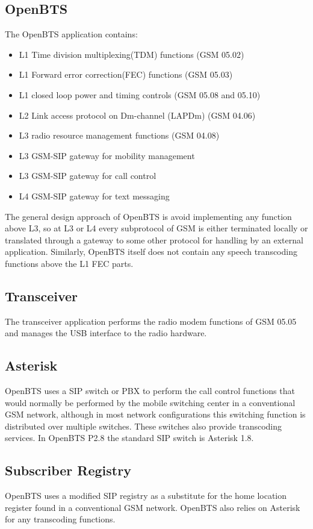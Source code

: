  \subsection{OpenBTS}
The OpenBTS application contains:
\begin{itemize}
	\item L1 Time division multiplexing(TDM) functions (GSM 05.02)
	\item L1 Forward error correction(FEC) functions (GSM 05.03)
	\item L1 closed loop power and timing controls (GSM 05.08 and 05.10)
	\item L2 Link access protocol on Dm-channel (LAPDm)  (GSM 04.06)
	\item L3 radio resource management functions (GSM 04.08)
	\item L3 GSM-SIP gateway for mobility management
	\item L3 GSM-SIP gateway for call control
	\item L4 GSM-SIP gateway for text messaging
\end{itemize}

The general design approach of OpenBTS is avoid implementing any function above L3, so at L3 or L4 every subprotocol of GSM is either terminated locally or translated through a gateway to some other protocol for handling by an external application. Similarly, OpenBTS itself does not contain any speech transcoding functions above the L1 FEC parts.

\subsection{Transceiver}
The transceiver application performs the radio modem functions of GSM 05.05 and manages the USB interface to the radio hardware.

\subsection{Asterisk}
OpenBTS uses a SIP switch or PBX to perform the call control functions that would normally be performed by the mobile switching center in a conventional GSM network, although in most network configurations this switching function is distributed over multiple switches. These switches also provide transcoding services. In OpenBTS P2.8 the standard SIP switch is Asterisk 1.8.

\subsection{Subscriber Registry}
OpenBTS uses a modified SIP registry as a substitute for the home location register found in a conventional GSM network. OpenBTS also relies on Asterisk for any transcoding functions. 

